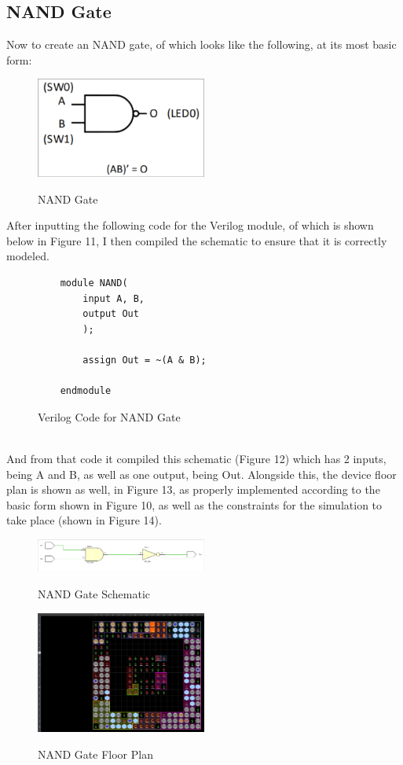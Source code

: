 \documentclass{article}
\begin{document}
\subsection{NAND Gate}
Now to create an NAND gate, of which looks like the following, at its most basic form:
\begin{figure}[!htbp]
    \centering
    \caption{NAND Gate}
    \includegraphics[width=0.5\textwidth]{NAND-GATE.png}
    \label{NAND Gate, Simple}
\end{figure}\newline
After inputting the following code for the Verilog module, of which is shown below in Figure 11, I then compiled the schematic to ensure that it is correctly modeled.
\begin{figure}[!htbp]
    \centering
    \caption{Verilog Code for NAND Gate}
    \begin{verbatim}
    module NAND(
        input A, B,
        output Out
        );
        
        assign Out = ~(A & B);
        
    endmodule
    \end{verbatim}
\end{figure}\\
And from that code it compiled this schematic (Figure 12) which has 2 inputs, being A and B, as well as one output, being Out. Alongside this, the device floor plan is shown as well, in Figure 13, as properly implemented according to the basic form shown in Figure 10, as well as the constraints for the simulation to take place (shown in Figure 14).
\begin{figure}[!htbp]
    \centering
    \caption{NAND Gate Schematic}
    \includegraphics[width=0.5\textwidth]{NAND-GATE-SCHEMATIC.png}
    \label{NAND Gate, Schematic}
\end{figure}
\begin{figure}[!htbp]
    \centering
    \caption{NAND Gate Floor Plan}
    \includegraphics[width=0.5\textwidth]{NAND-GATE-FLOOR-PLAN.png}
    \label{NAND Gate, Floor Plan}
\end{figure}
\end{document}
